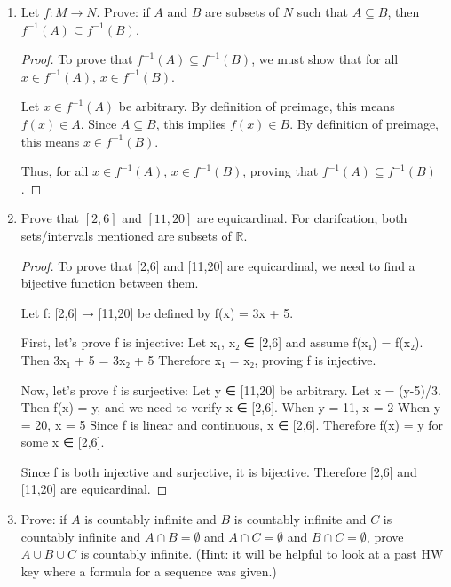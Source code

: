 \documentclass{article}
\begin{document}
\begin{enumerate}
\newpage

\item Let $f : M \to N$. Prove: if $A$ and $B$ are subsets of $N$ such that $A \subseteq B$, then $f^{-1}(A) \subseteq f^{-1}(B)$.

\begin{proof}
    To prove that $f^{-1}(A) \subseteq f^{-1}(B)$, we must show that for all $x \in f^{-1}(A)$, $x \in f^{-1}(B)$.

    Let $x \in f^{-1}(A)$ be arbitrary.
    By definition of preimage, this means $f(x) \in A$.
    Since $A \subseteq B$, this implies $f(x) \in B$.
    By definition of preimage, this means $x \in f^{-1}(B)$.

    Thus, for all $x \in f^{-1}(A)$, $x \in f^{-1}(B)$, proving that $f^{-1}(A) \subseteq f^{-1}(B)$.
\end{proof}

\newpage

\item Prove that $[2,6]$ and $[11,20]$ are equicardinal. For clarifcation, both sets/intervals mentioned are subsets of $\mathbb{R}$.

\newpage

\begin{proof}
    To prove that [2,6] and [11,20] are equicardinal, we need to find a bijective function between them.

    Let f: [2,6] → [11,20] be defined by f(x) = 3x + 5.

    First, let's prove f is injective:
    Let x₁, x₂ ∈ [2,6] and assume f(x₁) = f(x₂).
    Then 3x₁ + 5 = 3x₂ + 5
    Therefore x₁ = x₂, proving f is injective.

    Now, let's prove f is surjective:
    Let y ∈ [11,20] be arbitrary.
    Let x = (y-5)/3.
    Then f(x) = y, and we need to verify x ∈ [2,6].
    When y = 11, x = 2
    When y = 20, x = 5
    Since f is linear and continuous, x ∈ [2,6].
    Therefore f(x) = y for some x ∈ [2,6].

    Since f is both injective and surjective, it is bijective.
    Therefore [2,6] and [11,20] are equicardinal.
\end{proof}

\item Prove: if $A$ is countably infinite and $B$ is countably infinite and $C$ is countably infinite and $A \cap B = \emptyset$ and $A \cap C= \emptyset$ and $B \cap C = \emptyset$, prove $A \cup B \cup C$ is countably infinite. (Hint: it will be helpful to look at a past HW key where a formula for a sequence was given.)

\end{enumerate}
\end{document}
